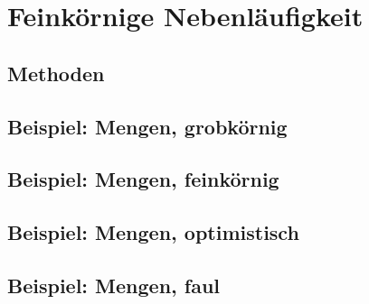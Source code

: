\chapter{Feinkörnige Nebenläufigkeit}

\section{Methoden}

\section{Beispiel: Mengen, grobkörnig}

\section{Beispiel: Mengen, feinkörnig}

\section{Beispiel: Mengen, optimistisch}

\section{Beispiel: Mengen, faul}